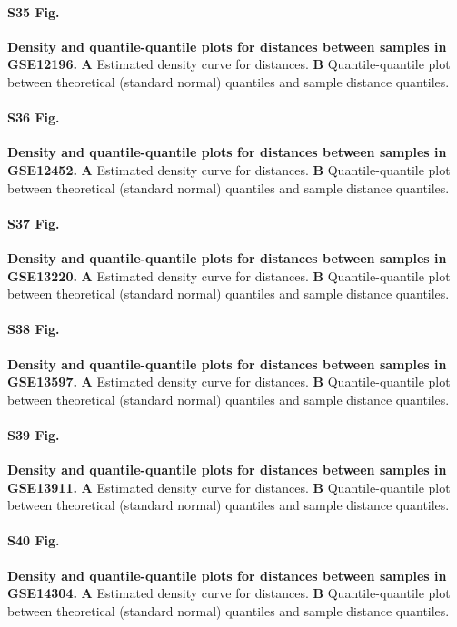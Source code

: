 \documentclass[10pt,letterpaper]{article}
\begin{document}
\paragraph*{S35 Fig.}
\hypertarget{S35_Fig}{
{\bf Density and quantile-quantile plots for distances between samples in GSE12196.} \textbf{A} Estimated density curve for distances. \textbf{B} Quantile-quantile plot between theoretical (standard normal) quantiles and sample distance quantiles.}

\paragraph*{S36 Fig.}
\hypertarget{S36_Fig}{
{\bf Density and quantile-quantile plots for distances between samples in GSE12452.} \textbf{A} Estimated density curve for distances. \textbf{B} Quantile-quantile plot between theoretical (standard normal) quantiles and sample distance quantiles.}

\paragraph*{S37 Fig.}
\hypertarget{S37_Fig}{
{\bf Density and quantile-quantile plots for distances between samples in GSE13220.} \textbf{A} Estimated density curve for distances. \textbf{B} Quantile-quantile plot between theoretical (standard normal) quantiles and sample distance quantiles.}

\paragraph*{S38 Fig.}
\hypertarget{S38_Fig}{
{\bf Density and quantile-quantile plots for distances between samples in GSE13597.} \textbf{A} Estimated density curve for distances. \textbf{B} Quantile-quantile plot between theoretical (standard normal) quantiles and sample distance quantiles.}

\paragraph*{S39 Fig.}
\hypertarget{S39_Fig}{
{\bf Density and quantile-quantile plots for distances between samples in GSE13911.} \textbf{A} Estimated density curve for distances. \textbf{B} Quantile-quantile plot between theoretical (standard normal) quantiles and sample distance quantiles.}

\paragraph*{S40 Fig.}
\hypertarget{S40_Fig}{
{\bf Density and quantile-quantile plots for distances between samples in GSE14304.} \textbf{A} Estimated density curve for distances. \textbf{B} Quantile-quantile plot between theoretical (standard normal) quantiles and sample distance quantiles.}
\end{document}
